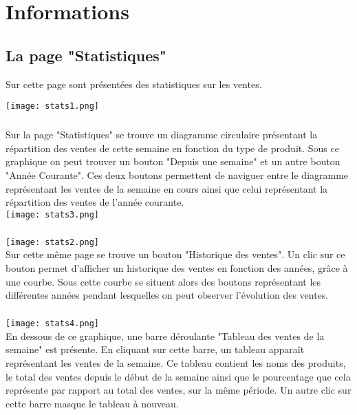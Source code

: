 \chapter{Informations}

\section{La page "Statistiques"}
Sur cette page sont présentées des statistiques sur les ventes.

\texttt{[image: stats1.png]}
\paragraph{}
Sur la page "Statistiques" se trouve un diagramme circulaire présentant la
répartition des ventes de cette semaine en fonction du type de produit. Sous
ce graphique on peut trouver un bouton "Depuis une semaine" et un autre bouton
"Année Courante". Ces deux boutons permettent de naviguer entre le diagramme
représentant les ventes de la semaine en cours ainsi que celui représentant la
répartition des ventes de l'année courante.\\

\texttt{[image: stats3.png]}

\paragraph{}
\texttt{[image: stats2.png]}\\
Sur cette même page se trouve un bouton "Historique des ventes". Un clic sur ce
bouton permet d'afficher un historique des ventes en fonction des années,
grâce à une courbe. Sous cette courbe se situent alors des boutons représentant
les différentes années pendant lesquelles on peut observer l'évolution des ventes.

\paragraph{}
\texttt{[image: stats4.png]}\\
En dessous de ce graphique, une barre déroulante "Tableau des ventes de la
semaine" est présente. En cliquant sur cette barre, un tableau apparaît
représentant les ventes de la semaine. Ce tableau contient les noms des
produits, le total des ventes depuis le début de la semaine ainsi que le
pourcentage que cela représente par rapport au total des ventes, sur la même
période. Un autre clic sur cette barre masque le tableau à nouveau.



